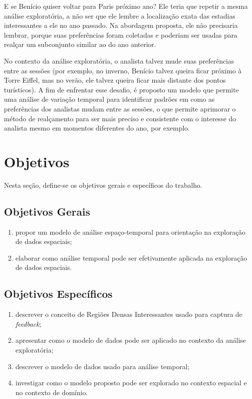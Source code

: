 E se Benício quiser voltar para Paris próximo ano? Ele teria que repetir a mesma análise exploratória, a não ser que ele lembre a localização exata das estadias interessantes a ele no ano passado. Na abordagem proposta, ele não precisaria lembrar, porque suas preferências foram coletadas e poderiam ser usadas para realçar um subconjunto similar ao do ano anterior.

No contexto da análise exploratória, o analista talvez mude suas preferências entre as sessões (por exemplo, no inverno, Benício talvez queira ficar próximo à Torre Eiffel, mas no verão, ele talvez queira ficar mais distante dos pontos turísticos). A fim de enfrentar esse desafio, é proposto um modelo que permite uma análise de variação temporal para identificar padrões em como as preferências dos analistas mudam entre as sessões, o que permite aprimorar o método de realçamento para ser mais preciso e consistente com o interesse do analista mesmo em momentos diferentes do ano, por exemplo.

\section{Objetivos}

Nesta seção, define-se os objetivos gerais e específicos do trabalho.

\subsection{Objetivos Gerais}

\begin{enumerate}[label=\alph*)]
	\tightlist
	\item propor um modelo de análise espaço-temporal para orientação na exploração de dados espaciais;
	\item elaborar como análise temporal pode ser efetivamente aplicada na exploração de dados espaciais.
\end{enumerate}

\subsection{Objetivos Específicos}

\begin{enumerate}[label=\alph*)]
	\tightlist
	\item descrever o conceito de Regiões Densas Interessantes usado para captura de {\em feedback};
	\item apresentar como o modelo de dados pode ser aplicado no contexto da análise exploratória;
	\item descrever o modelo de dados usado para análise temporal;
	\item investigar como o modelo proposto pode ser explorado no contexto espacial e no contexto de domínio.
\end{enumerate}

